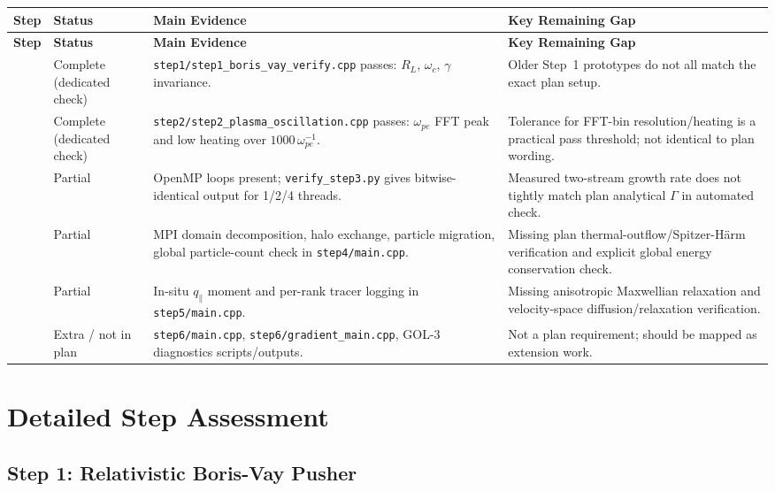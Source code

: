 \documentclass[11pt,a4paper]{article}
\begin{document}
\begin{longtable}{>{\raggedright\arraybackslash}p{}>{\raggedright\arraybackslash}p{}>{\raggedright\arraybackslash}p{}>{\raggedright\arraybackslash}p{}}
\toprule
\textbf{Step} & \textbf{Status} & \textbf{Main Evidence} & \textbf{Key Remaining Gap} \\
\midrule
\endfirsthead
\toprule
\textbf{Step} & \textbf{Status} & \textbf{Main Evidence} & \textbf{Key Remaining Gap} \\
\midrule
\endhead
1 & Complete (dedicated check) & \texttt{step1/step1\_boris\_vay\_verify.cpp} passes: $R_L$, $\omega_c$, $\gamma$ invariance. & Older Step~1 prototypes do not all match the exact plan setup. \\
2 & Complete (dedicated check) & \texttt{step2/step2\_plasma\_oscillation.cpp} passes: $\omega_{pe}$ FFT peak and low heating over $1000\,\omega_{pe}^{-1}$. & Tolerance for FFT-bin resolution/heating is a practical pass threshold; not identical to plan wording. \\
3 & Partial & OpenMP loops present; \texttt{verify\_step3.py} gives bitwise-identical output for 1/2/4 threads. & Measured two-stream growth rate does not tightly match plan analytical $\Gamma$ in automated check. \\
4 & Partial & MPI domain decomposition, halo exchange, particle migration, global particle-count check in \texttt{step4/main.cpp}. & Missing plan thermal-outflow/Spitzer-H\"arm verification and explicit global energy conservation check. \\
5 & Partial & In-situ $q_\parallel$ moment and per-rank tracer logging in \texttt{step5/main.cpp}. & Missing anisotropic Maxwellian relaxation and velocity-space diffusion/relaxation verification. \\
6 & Extra / not in plan & \texttt{step6/main.cpp}, \texttt{step6/gradient\_main.cpp}, GOL-3 diagnostics scripts/outputs. & Not a plan requirement; should be mapped as extension work. \\
\bottomrule
\end{longtable}

\section{Detailed Step Assessment}

\subsection{Step 1: Relativistic Boris-Vay Pusher}
\end{document}
